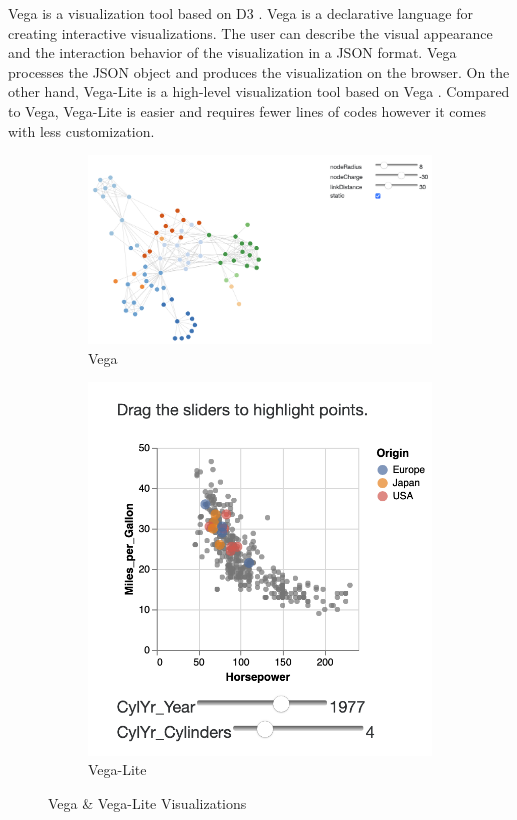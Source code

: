 Vega is a visualization tool based on D3 \cite{2016-reactive-vega-architecture}. Vega is a declarative language for creating interactive visualizations. The user can describe the visual appearance and the interaction behavior of the visualization in a JSON format. Vega processes the JSON object and produces the visualization on the browser. On the other hand, Vega-Lite is a high-level visualization tool based on Vega \cite{2017-vega-lite}. Compared to Vega, Vega-Lite is easier and requires fewer lines of codes however it comes with less customization.

\begin{figure}[H]
\begin{subfigure}{.45\textwidth}
  \centering
  \captionsetup{justification=centering}
  \includegraphics[width=0.8\linewidth]{./pics/vega.png}  
  \caption{Vega \cite{vega}}
  \label{fig:sub-first-vega}
\end{subfigure}
\begin{subfigure}{.45\textwidth}
  \centering
  \captionsetup{justification=centering}
  \includegraphics[width=.8\linewidth]{./pics/vegalite.png}  
  \caption{Vega-Lite \cite{vegalite}}
  \label{fig:sub-second-vegalite}
\end{subfigure}
\captionsetup{justification=centering}
\caption{Vega \& Vega-Lite Visualizations}
\label{fig:viga-vigalite}
\end{figure}

